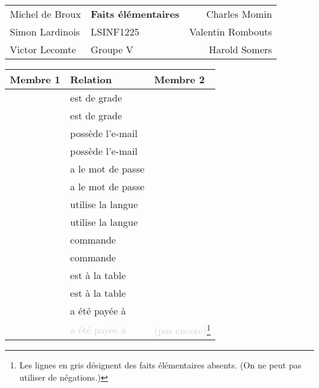 \documentclass[a4paper,10pt]{article}
\begin{document}
\begin{center}
\begin{tabu} to \textwidth {lX[c]r}
    Michel de Broux & \large{\textbf{Faits élémentaires}} & Charles Momin \\
    Simon Lardinois & LSINF1225 & Valentin Rombouts \\
    Victor Lecomte & Groupe V & Harold Somers \\
    \hline
\end{tabu}
\end{center}

\vspace{1cm}

\begin{center}
\begin{tabu}{lll}
    Membre 1 & Relation & Membre 2 \\
    \hline
     & est de grade &  \\
     & est de grade &  \\
     & possède l'e-mail &  \\
     & possède l'e-mail &  \\
     & a le mot de passe &  \\
     & a le mot de passe &  \\
     & utilise la langue &  \\
     & utilise la langue &  \\
     & commande &  \\
     & commande &  \\
     & est à la table &  \\
     & est à la table &  \\
     & a été payée à &  \\
    \textcolor{lightgray}{} & \textcolor{lightgray}{a été payée à} & \textcolor{lightgray}{(pas encore)\footnote{\label{gris}Les lignes en gris désignent des faits élémentaires absents. (On ne peut pas utiliser de négations.)}} \\

\end{tabu}
\end{center}
\end{document}
